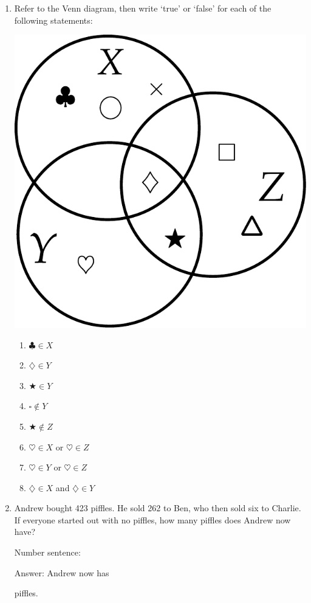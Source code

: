 \documentclass{tufte-book}
\begin{document}
\begin{enumerate}
  \item Refer to the Venn diagram, then write `true' or `false' for each of the following statements:
  \begin{marginfigure}\includegraphics[width=\textwidth]{maths/fig/venn_3.pdf}\end{marginfigure}
  \begin{multicols}{2}
    \begin{enumerate}
      \item $\clubsuit \in X$ \dotfill\bigskip
      \item $\diamondsuit \in Y$ \dotfill\bigskip
      \item $\bigstar \in Y$ \dotfill\bigskip
      \item $\square \notin Y$ \dotfill
      \item $\bigstar \notin Z$ \dotfill\bigskip
      \item $\heartsuit \in X$ or $\heartsuit \in Z$ \dotfill\bigskip
      \item $\heartsuit \in Y$ or $\heartsuit \in Z$ \dotfill\bigskip
      \item $\diamondsuit \in X$ and $\diamondsuit \in Y$ \dotfill
    \end{enumerate}
    \end{multicols}

  \item Andrew bought 423 piffles. He sold 262 to Ben, who then sold six to Charlie.
  If everyone started out with no piffles, 
  how many piffles does Andrew now have?\bigskip\par
  Number sentence: \dotfill\bigskip\par
  Answer: Andrew now has \dotfill\bigskip\par\dotfill\bigskip\par\dotfill\bigskip piffles.
  
\end{enumerate}
\end{document}
